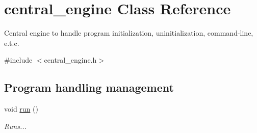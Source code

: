 \hypertarget{classcentral__engine}{\section{central\-\_\-engine Class Reference}
\label{classcentral__engine}
}


Central engine to handle program initialization, uninitialization, command-\/line, e.\-t.\-c.  




{\ttfamily \#include $<$central\-\_\-engine.\-h$>$}

\subsection*{Program handling management}
\begin{DoxyCompactItemize}
\item 
\hypertarget{classcentral__engine_ad71abe717a7b00af96d485d9d20f03a5}{void \hyperlink{classcentral__engine_ad71abe717a7b00af96d485d9d20f03a5}{run} ()}\label{classcentral__engine_ad71abe717a7b00af96d485d9d20f03a5}

\begin{DoxyCompactList}\small\item\em Runs... \end{DoxyCompactList}\end{DoxyCompactItemize}
